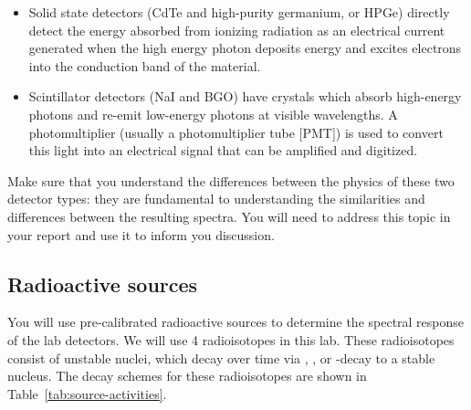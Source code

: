 \documentclass{tufte-book}
\begin{document}
\begin{itemize}
    \item 
        Solid state detectors (CdTe and high-purity germanium, or HPGe) directly detect the energy absorbed from ionizing radiation as an electrical current generated when the high energy photon deposits energy and excites electrons into the conduction band of the material.
    \item 
        Scintillator detectors (NaI and BGO) have crystals which absorb high-energy photons and re-emit low-energy photons at visible wavelengths. A photomultiplier (usually a photomultiplier tube [PMT]) is used to convert this light into an electrical signal that can be amplified and digitized.
\end{itemize}

Make sure that you understand the differences between the physics of these two detector types: they are fundamental to understanding the similarities and differences between the resulting spectra. You will need to address this topic in your report and use it to inform you discussion.

\subsection{Radioactive sources}

You will use pre-calibrated radioactive sources to determine the spectral response of the lab detectors. We will use 4 radioisotopes in this lab. These radioisotopes consist of unstable nuclei, which decay over time via \textalpha, \textbeta, or \textgamma-decay to a stable nucleus. The decay schemes for these radioisotopes are shown in Table~\ref{tab:source-activities}.
\end{document}
